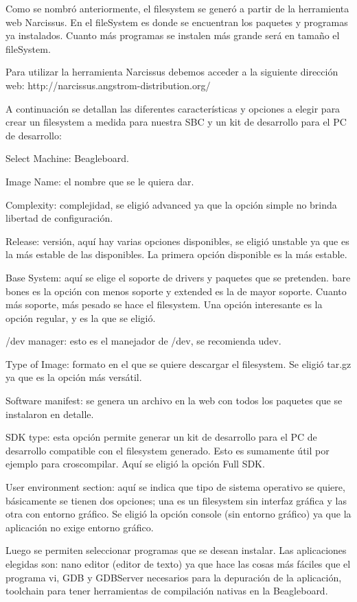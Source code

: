 Como se nombró anteriormente, el filesystem se generó a partir de la herramienta web Narcissus.
En el fileSystem es donde se encuentran los paquetes y programas ya instalados. Cuanto más programas se instalen más grande será en tamaño el fileSystem.

\bigskip
Para utilizar la herramienta Narcissus debemos acceder a la siguiente dirección web: http://narcissus.angstrom-distribution.org/ 

\bigskip
A continuación se detallan las diferentes características y opciones a elegir para crear un filesystem a medida para nuestra SBC y un kit de desarrollo para el PC de desarrollo:

\bigskip
Select Machine: Beagleboard.

Image Name: el nombre que se le quiera dar.

Complexity: complejidad, se eligió advanced ya que la opción simple no brinda libertad de configuración.

Release: versión, aquí hay varias opciones disponibles, se eligió unstable ya que es la más estable de las disponibles. La primera opción disponible es la más estable.

Base System: aquí se elige el soporte de drivers y paquetes que se pretenden. bare bones es la opción con menos soporte y extended es la de mayor soporte. Cuanto más soporte, más pesado se hace el filesystem. Una opción interesante es la opción regular, y es la que se eligió.

/dev manager: esto es el manejador de /dev, se recomienda udev.

Type of Image: formato en el que se quiere descargar el filesystem. Se eligió tar.gz ya que es la opción más versátil.

Software manifest: se genera un archivo en la web con todos los paquetes que se instalaron en detalle.

SDK type: esta opción permite generar un kit de desarrollo para el PC de desarrollo compatible con el filesystem generado. Esto es sumamente útil por ejemplo para croscompilar. Aquí se eligió la opción Full SDK.

User environment section: aquí se indica que tipo de sistema operativo se quiere, básicamente se tienen dos opciones; una es un filesystem sin interfaz gráfica y las otra con entorno gráfico. Se eligió la opción console (sin entorno gráfico) ya que la aplicación no exige entorno gráfico.

\bigskip
Luego se permiten seleccionar programas que se desean instalar.
Las aplicaciones elegidas son: nano editor (editor de texto) ya que hace las cosas más fáciles que el programa vi, GDB y GDBServer necesarios para la depuración de la aplicación, toolchain para tener herramientas de compilación nativas en la Beagleboard.

